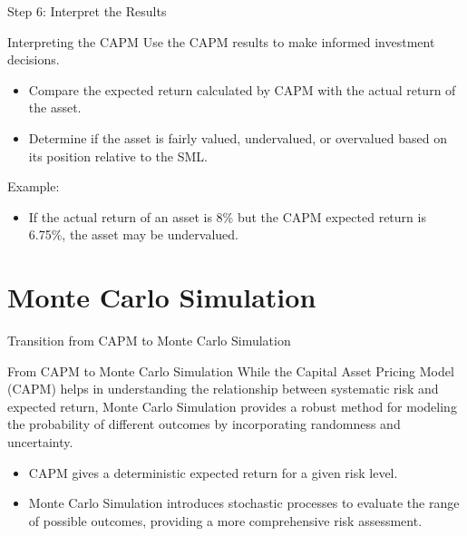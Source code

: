 \documentclass{beamer}
\begin{document}
\begin{frame}{Step 6: Interpret the Results}
  \begin{block}{Interpreting the CAPM}
    Use the CAPM results to make informed investment decisions.
    \begin{itemize}
      \item Compare the expected return calculated by CAPM with the actual return of the asset.
      \item Determine if the asset is fairly valued, undervalued, or overvalued based on its position relative to the SML.
    \end{itemize}
    Example:
    \begin{itemize}
      \item If the actual return of an asset is 8\% but the CAPM expected return is 6.75\%, the asset may be undervalued.
    \end{itemize}
  \end{block}
\end{frame}

\section{Monte Carlo Simulation}
\begin{frame}{Transition from CAPM to Monte Carlo Simulation}
  \begin{block}{From CAPM to Monte Carlo Simulation}
    While the Capital Asset Pricing Model (CAPM) helps in understanding the relationship between systematic risk and expected return, Monte Carlo Simulation provides a robust method for modeling the probability of different outcomes by incorporating randomness and uncertainty.
    \begin{itemize}
      \item CAPM gives a deterministic expected return for a given risk level.
      \item Monte Carlo Simulation introduces stochastic processes to evaluate the range of possible outcomes, providing a more comprehensive risk assessment.
    \end{itemize}
  \end{block}
\end{frame}
\end{document}
